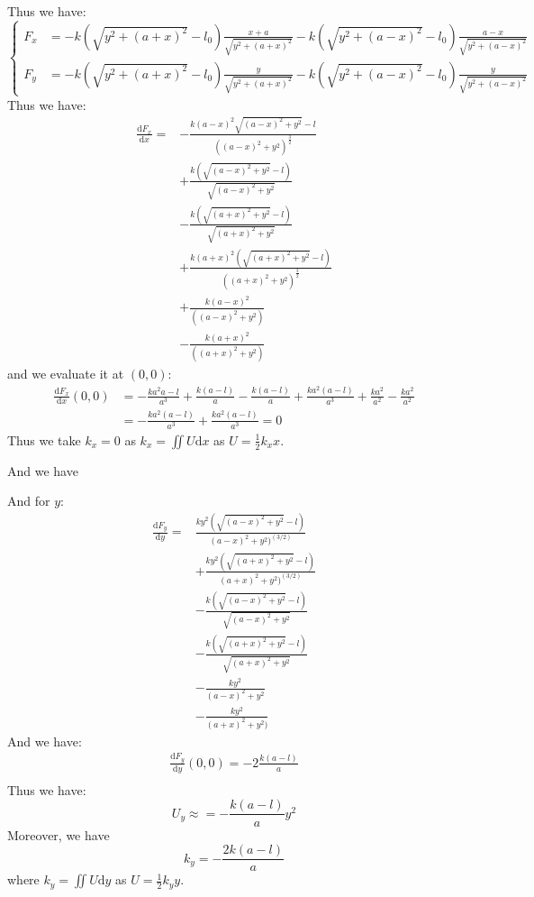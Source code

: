 \documentclass{article}
\newcommand{\de}{\mathrm{d}}
\begin{document}
\begin{enumerate}
    Thus we have:
    \[
    \left\{
    \begin{aligned}
    F_x &= -k(\sqrt{y^2 + (a+x)^2}-l_0)\frac{x+a}{\sqrt{y^2 + (a+x)^2}} - k(\sqrt{y^2 + (a-x)^2} - l_0)\frac{a-x}{\sqrt{y^2 + (a-x)^2}} \\
    F_y &= -k(\sqrt{y^2 + (a+x)^2}-l_0)\frac{y}{\sqrt{y^2 + (a+x)^2}} - k(\sqrt{y^2 + (a-x)^2}-l_0)\frac{y}{\sqrt{y^2 + (a-x)^2}}
    \end{aligned}
    \right. 
    \] 
    Thus we have:
    \begin{align*}
        \frac{\de F_x}{\de x} =& -\frac{k (a - x)^2 \sqrt{(a - x)^2 + y^2} - l}{((a - x)^2 + y^2)^\frac{3}{2}} \\\
        &+ \frac{k (\sqrt{(a - x)^2 + y^2} - l)}{\sqrt{(a - x)^2 + y^2}} \\
        &- \frac{k (\sqrt{(a + x)^2 + y^2} - l)}{\sqrt{(a + x)^2 + y^2}} \\
        &+ \frac{k (a + x)^2 (\sqrt{(a + x)^2 + y^2} - l)}{((a + x)^2 + y^2)^\frac{3}{2}} \\
        &+ \frac{k (a - x)^2}{((a - x)^2 + y^2)} \\
        &- \frac{k (a + x)^2}{((a + x)^2 + y^2)}
    \end{align*}
    and we evaluate it at $(0,0)$:
    \begin{align*}
        \frac{\de F_x}{\de x}(0,0) &= -\frac{k a^2 a - l}{a^3} 
        + \frac{k (a - l)}{a} 
        - \frac{k (a - l)}{a} 
        + \frac{k a^2 (a - l)}{a^3} 
        + \frac{k a^2}{a^2} 
        - \frac{k a^2}{a^2} \\
        &= -\frac{k a^2 (a - l)}{a^3} 
        + \frac{k a^2 (a - l)}{a^3} =0
    \end{align*}
    Thus we take $k_x = 0$ as $k_x = \iint U \de x$ as $U = \frac{1}{2}k_xx$.

    And we have

    And for $y$:
    \begin{align*}
        \frac{\de F_y}{\de y} = 
        &\frac{k y^2 (\sqrt{(a - x)^2 + y^2} - l)}{(a - x)^2 + y^2)^(3/2)}\\
        &+ \frac{k y^2 (\sqrt{(a + x)^2 + y^2} - l)}{(a + x)^2 + y^2)^(3/2)} \\
        &- \frac{k (\sqrt{(a - x)^2 + y^2} - l)}{\sqrt{(a - x)^2 + y^2} }\\
        &- \frac{k (\sqrt{(a + x)^2 + y^2} - l)}{\sqrt{(a + x)^2 + y^2} }\\
        &- \frac{k y^2}{(a - x)^2 + y^2} \\
        &- \frac{k y^2}{(a + x)^2 + y^2)}
    \end{align*}
    And we have:
    \begin{align*}
        \frac{\de F_y}{\de y} (0,0) = - 2\frac{k (a - l)}{a}\\
    \end{align*}
    Thus we have:
    \[
        U_y \approx = -\frac{k (a - l)}{a}y^2
    \]
    Moreover, we have
    \[
        k_y =  -\frac{2k (a - l)}{a}
    \]
    where $k_y = \iint U \de y$ as $U = \frac{1}{2}k_yy$.


\end{enumerate}
\end{document}
